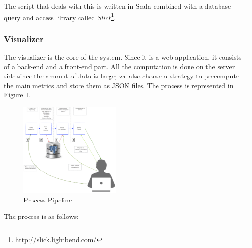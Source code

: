\documentclass[]{usiinfbachelorproject}
\begin{document}
The script that deals with this is written in Scala combined with a database query and access library called \textit{Slick}\footnote{http://slick.lightbend.com/}.


\subsubsection{Visualizer}
The visualizer is the core of the system. Since it is a web application, it consists of a back-end and a front-end part. All the computation is done on the server side since the amount of data is large; we also choose a strategy to precompute the main metrics and store them as JSON files.
The process is represented in  Figure \ref{fig:processPipeline}.


\begin{figure}[ht]
	\centering
	\includegraphics[width=0.45\textwidth]{images/processPipeline}
	\caption[Process Pipeline]{Process Pipeline\label{fig:processPipeline}}
\end{figure}

The process is as follows:
\end{document}
